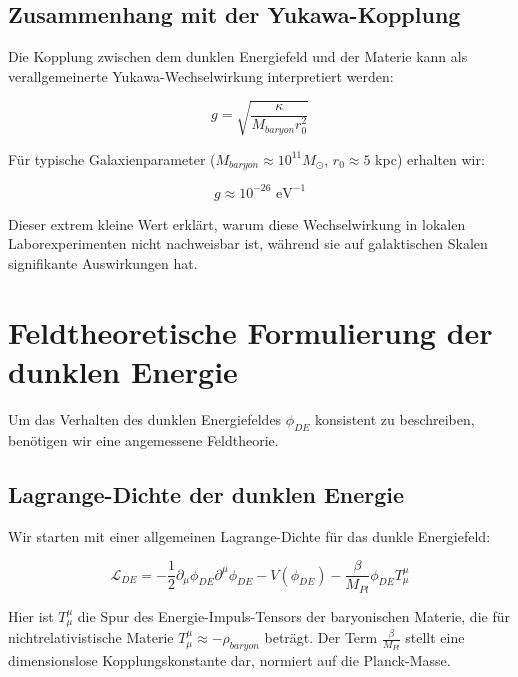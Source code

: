 \documentclass[a4paper,12pt]{article}
\begin{document}
	\subsection{Zusammenhang mit der Yukawa-Kopplung}
	
	Die Kopplung zwischen dem dunklen Energiefeld und der Materie kann als verallgemeinerte Yukawa-Wechselwirkung interpretiert werden:
	
	\begin{equation}
		g = \sqrt{\frac{\kappa}{M_{baryon} r_0^2}}
	\end{equation}
	
	Für typische Galaxienparameter ($M_{baryon} \approx 10^{11} M_{\odot}$, $r_0 \approx 5$ kpc) erhalten wir:
	
	\begin{equation}
		g \approx 10^{-26} \text{ eV}^{-1}
	\end{equation}
	
	Dieser extrem kleine Wert erklärt, warum diese Wechselwirkung in lokalen Laborexperimenten nicht nachweisbar ist, während sie auf galaktischen Skalen signifikante Auswirkungen hat.
	
	\section{Feldtheoretische Formulierung der dunklen Energie}
	
	Um das Verhalten des dunklen Energiefeldes $\phi_{DE}$ konsistent zu beschreiben, benötigen wir eine angemessene Feldtheorie. 
	
	\subsection{Lagrange-Dichte der dunklen Energie}
	
	Wir starten mit einer allgemeinen Lagrange-Dichte für das dunkle Energiefeld:
	
	\begin{equation}
		\mathcal{L}_{DE} = -\frac{1}{2}\partial_\mu \phi_{DE} \partial^\mu \phi_{DE} - V(\phi_{DE}) - \frac{\beta}{M_{Pl}} \phi_{DE} T^{\mu}_{\mu}
	\end{equation}
	
	Hier ist $T^{\mu}_{\mu}$ die Spur des Energie-Impuls-Tensors der baryonischen Materie, die für nichtrelativistische Materie $T^{\mu}_{\mu} \approx -\rho_{baryon}$ beträgt. Der Term $\frac{\beta}{M_{Pl}}$ stellt eine dimensionslose Kopplungskonstante dar, normiert auf die Planck-Masse.
	
\end{document}

